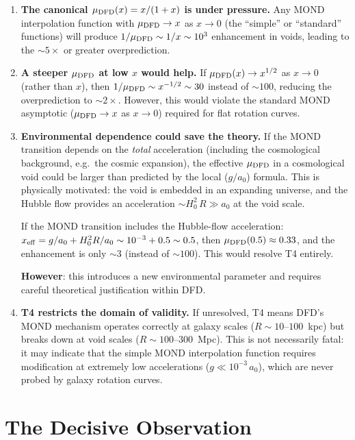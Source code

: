 \documentclass[11pt,a4paper]{article}
\newcommand{\aM}{a_0}
\newcommand{\mufd}{\mu_{\rm DFD}}
\begin{document}
\begin{enumerate}
\item \textbf{The canonical $\mufd(x) = x/(1+x)$ is under pressure.}
  Any MOND interpolation function with $\mufd \to x$ as $x \to 0$
  (the ``simple'' or ``standard'' functions) will produce $1/\mufd
  \sim 1/x \sim 10^3$ enhancement in voids, leading to the
  $\sim 5\times$ or greater overprediction.

\item \textbf{A steeper $\mufd$ at low $x$ would help.} If
  $\mufd(x) \to x^{1/2}$ as $x \to 0$ (rather than $x$), then
  $1/\mufd \sim x^{-1/2} \sim 30$ instead of $\sim 100$, reducing
  the overprediction to $\sim 2\times$. However, this would violate
  the standard MOND asymptotic ($\mufd \to x$ as $x \to 0$) required
  for flat rotation curves.

\item \textbf{Environmental dependence could save the theory.} If the
  MOND transition depends on the \emph{total} acceleration (including
  the cosmological background, e.g.\ the cosmic expansion), the
  effective $\mufd$ in a cosmological void could be larger than predicted
  by the local ($g/\aM$) formula. This is physically motivated: the
  void is embedded in an expanding universe, and the Hubble flow
  provides an acceleration $\sim H_0^2\,R \gg \aM$ at the void scale.

  If the MOND transition includes the Hubble-flow acceleration:
  $x_{\rm eff} = g/\aM + H_0^2 R/\aM \sim 10^{-3} + 0.5 \sim 0.5$,
  then $\mufd(0.5) \approx 0.33$, and the enhancement is only $\sim 3$
  (instead of $\sim 100$). This would resolve T4 entirely.

  \textbf{However}: this introduces a new environmental parameter and
  requires careful theoretical justification within DFD.

\item \textbf{T4 restricts the domain of validity.} If unresolved,
  T4 means DFD's MOND mechanism operates correctly at galaxy scales
  ($R \sim 10$--$100$~kpc) but breaks down at void scales ($R \sim
  100$--$300$~Mpc). This is not necessarily fatal: it may indicate
  that the simple MOND interpolation function requires modification
  at extremely low accelerations ($g \ll 10^{-3}\,\aM$), which are
  never probed by galaxy rotation curves.
\end{enumerate}


\part{The Decisive Observation}
\label{part:observation}
\end{document}
